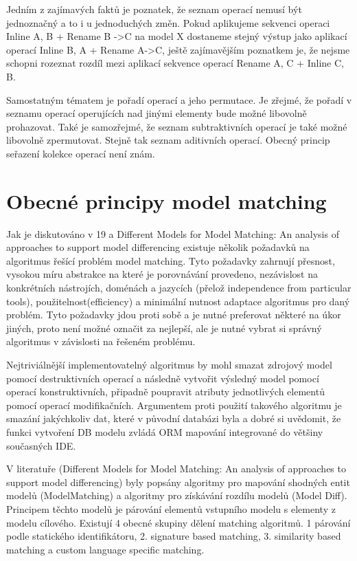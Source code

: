 \documentclass[11pt,twoside,a4paper]{book}
\begin{document}
Jedním z zajímavých faktů je poznatek, že seznam operací nemusí být jednoznačný
a to i u jednoduchých změn. Pokud aplikujeme sekvenci operaci Inline A, B + 
Rename B ->C na model X dostaneme stejný výstup jako aplikací operací Inline B,
A + Rename A->C, ještě zajímavějším poznatkem je, že nejsme schopni rozeznat
rozdíl mezi aplikací sekvence operací Rename A, C + Inline C, B.

Samostatným tématem je pořadí operací a jeho permutace. Je zřejmé, že pořadí v
seznamu operací operujících nad jinými elementy bude možné libovolně prohazovat.
Také je samozřejmé, že seznam subtraktivních operací je také možné libovolně
zpermutovat. Stejně tak seznam aditivních operací. Obecný princip seřazení kolekce 
operací není znám. 

\section{Obecné principy model matching}
Jak je diskutováno v 19 a Different Models for Model Matching:
An analysis of approaches to support model differencing existuje několik
požadavků na algoritmus řešící problém model matching. Tyto požadavky zahrnují
přesnost, vysokou míru abstrakce na které je porovnávání provedeno, nezávislost
na konkrétních nástrojích, doménách a jazycích (přelož independence from
particular tools), použitelnost(efficiency) a minimální nutnost adaptace
algoritmus pro daný problém. Tyto požadavky jdou proti sobě a je nutné
preferovat některé na úkor jiných, proto není možné označit za nejlepší, ale je
nutné vybrat si správný algoritmus v závislosti na řešeném problému.

Nejtriviálnější implementovatelný algoritmus by mohl smazat zdrojový model
pomocí destruktivních operací a následně vytvořit výsledný model pomocí operací
konstruktivních, připadně poupravit atributy jednotlivých elementů pomocí
operací modifikačních. Argumentem proti použití takového algoritmu je smazání
jakýchkoliv dat, které v původní databázi byla a dobré si uvědomit, že funkci
vytvoření DB modelu zvládá ORM mapování integrované do většiny současných IDE.

 V literatuře (Different Models for Model Matching:
An analysis of approaches to support model differencing) byly popsány algoritmy
pro mapování shodných entit modelů (ModelMatching) a algoritmy pro získávání
rozdílu modelů (Model Diff). 
 Principem těchto modelů je párování elementů vstupního modelu s elementy z
 modelu cílového. Existují 4 obecné skupiny dělení matching algoritmů. 1
 párování podle statického identifikátoru, 2. signature based matching, 3.
 similarity based matching a custom language specific matching.
 
\end{document}
